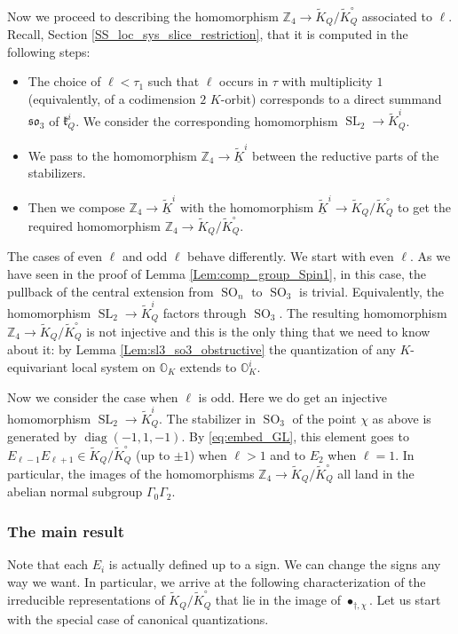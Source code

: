 \documentclass[12pt]{amsart}
\newcommand{\Orb}{\mathbb{O}}
\newcommand{\Z}{\mathbb{Z}}
\newcommand{\kf}{\mathfrak{k}}
\theoremstyle{definition}
\numberwithin{equation}{section}
\begin{document}
Now we proceed to describing the homomorphism $\Z_4\rightarrow \tilde{K}_Q/\tilde{K}_Q^\circ$
associated to $\ell$. Recall, Section \ref{SS_loc_sys_slice_restriction}, that it is computed in the following steps:

\begin{itemize}
\item[(I)] The choice of $\ell<\tau_1$ such that $\ell$ occurs in $\tau$
with multiplicity $1$ (equivalently, of a codimension $2$ $K$-orbit)
corresponds to a direct summand $\mathfrak{so}_3$
of $\kf^i_Q$. We consider the corresponding homomorphism $\operatorname{SL}_2\rightarrow \tilde{K}^i_Q$.
\item[(II)] We pass to the homomorphism $\Z_4\rightarrow \underline{\tilde{K}}^i$ between the reductive
parts of the stabilizers.
\item[(III)] Then we compose $\Z_4\rightarrow \underline{\tilde{K}}^i$ with the homomorphism
$\underline{\tilde{K}}^i\rightarrow \tilde{K}_Q/\tilde{K}_Q^\circ$ to get the required homomorphism
$\Z_4\rightarrow \tilde{K}_Q/\tilde{K}_Q^\circ$.
\end{itemize}

The cases of even $\ell$ and odd $\ell$ behave differently. We start with even $\ell$.
As we have seen in the proof of Lemma \ref{Lem:comp_group_Spin1}, in this case, the pullback of the central extension
from $\operatorname{SO}_n$ to $\operatorname{SO}_3$ is trivial. Equivalently,
the homomorphism $\operatorname{SL}_2\rightarrow \tilde{K}^i_Q$ factors through $\operatorname{SO}_3$.
The resulting homomorphism $\Z_4\rightarrow \tilde{K}_Q/\tilde{K}_Q^\circ$ is not injective and
this is the only thing that we need to know about it: by Lemma \ref{Lem:sl3_so3_obstructive}
the quantization of any $K$-equivariant local system on $\Orb_K$ extends to $\Orb_K^i$.

Now we consider the case when $\ell$ is odd. Here we do get an injective homomorphism
$\operatorname{SL}_2\rightarrow \tilde{K}^i_Q$. The stabilizer in $\operatorname{SO}_3$ of the
point $\chi$ as above is generated by $\operatorname{diag}(-1,1,-1)$. By \eqref{eq:embed_GL}, this element goes to
$E_{\ell-1}E_{\ell+1}\in \tilde{K}_Q/\tilde{K}_Q^\circ$ (up to $\pm 1$) when $\ell>1$ and to
$E_2$ when $\ell=1$.  In particular, the images of the homomorphisms
$\Z_4\rightarrow \tilde{K}_Q/\tilde{K}_Q^\circ$ all land in the abelian normal subgroup
$\Gamma_0\Gamma_2$.


\subsubsection{The main result}
Note that each $E_i$ is actually defined up to a sign. We can change the signs any way we want.
In particular, we arrive at the following characterization of the irreducible representations
of $\tilde{K}_Q/\tilde{K}_Q^\circ$ that lie in the image of $\bullet_{\dagger,\chi}$. Let us start with the special case of canonical quantizations.
\end{document}
